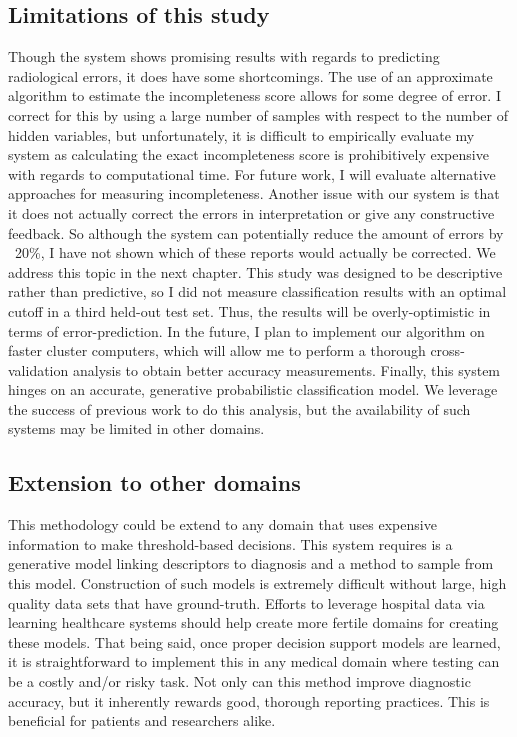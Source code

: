 \subsection{Limitations of this study}
Though the system shows promising results with regards to predicting radiological errors, it does have some shortcomings. The use of an approximate algorithm to estimate the incompleteness score allows for some degree of error. I correct for this by using a large number of samples with respect to the number of hidden variables, but unfortunately, it is difficult to empirically evaluate my system as calculating the exact incompleteness score is prohibitively expensive with regards to computational time. For future work, I will evaluate alternative approaches for measuring incompleteness. Another issue with our system is that it does not actually correct the errors in interpretation or give any constructive feedback. So although the system can potentially reduce the amount of errors by  ~20\%, I have not shown which of these reports would actually be corrected. We address this topic in the next chapter. This study was designed to be descriptive rather than predictive, so I did not measure classification results with an optimal cutoff in a third held-out test set. Thus, the results will be overly-optimistic in terms of error-prediction. In the future, I plan to implement our algorithm on faster cluster computers, which will allow me to perform a thorough cross-validation analysis to obtain better accuracy measurements. Finally, this system hinges on an accurate, generative probabilistic classification model. We leverage the success of previous work \cite{Burnside:2009br} to do this analysis, but the availability of such systems may be limited in other domains.

\subsection{Extension to other domains}
This methodology could be extend to any domain that uses expensive information to make threshold-based decisions. This system requires is a generative model linking descriptors to diagnosis and a method to sample from this model. Construction of such models is extremely difficult without large, high quality data sets that have ground-truth. Efforts to leverage hospital data via learning healthcare systems should help create more fertile domains for creating these models. That being said, once proper decision support models are learned, it is straightforward to implement this in any medical domain where testing can be a costly and/or risky task. Not only can this method improve diagnostic accuracy, but it inherently rewards good, thorough reporting practices. This is beneficial for patients and researchers alike.
